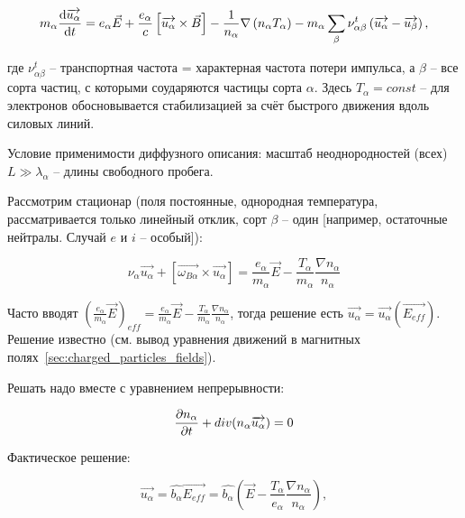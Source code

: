 \documentclass[10pt, a4paper]{article}
\begin{document}
\begin{equation*}
	m_\alpha\dv{\overrightarrow{u_\alpha}}{t}=e_\alpha\vec{E}+\frac{e_\alpha}{c}\left[\overrightarrow{u_\alpha}\times\vec{B}\right]-\frac{1}{n_\alpha}\nabla\left(n_\alpha T_\alpha\right)- m_\alpha\sum\limits_{\beta}\nu_{\alpha\beta}^t\left(\overrightarrow{u_\alpha}-\overrightarrow{u_\beta}\right),
\end{equation*}

где $\nu_{\alpha\beta}^t$ -- транспортная частота = характерная частота потери импульса, а $\beta$ -- все сорта частиц, с которыми соударяются частицы сорта $\alpha$. Здесь $T_\alpha=const$ -- для электронов обосновывается стабилизацией за счёт быстрого движения вдоль силовых линий.

Условие применимости диффузного описания: масштаб неоднородностей (всех) $L \gg \lambda_\alpha$ -- длины свободного пробега.

Рассмотрим стационар (поля постоянные, однородная температура, рассматривается только линейный отклик, сорт $\beta$ -- один [например, остаточные нейтралы. Случай $e$ и $i$ -- особый]):

\begin{equation*}
	\nu_\alpha \overrightarrow{u_\alpha} + \left[\overrightarrow{\omega_{B\alpha}}\times \overrightarrow{u_\alpha}\right] = \frac{e_\alpha}{m_\alpha}\vec{E}-\frac{T_\alpha}{m_\alpha}\frac{\nabla n_\alpha}{n_\alpha}
\end{equation*}

Часто вводят $\left(\frac{e_\alpha}{m_\alpha}\vec{E}\right)_{eff} = \frac{e_\alpha}{m_\alpha}\vec{E}-\frac{T_\alpha}{m_\alpha}\frac{\nabla n_\alpha}{n_\alpha}$, тогда решение есть $\overrightarrow{u_\alpha} = \overrightarrow{u_\alpha} (\overrightarrow{E_{eff}})$. Решение известно (см. вывод уравнения движений в магнитных полях~\eqref{sec:charged_particles_fields}).

Решать надо вместе с уравнением непрерывности:

\begin{equation*}
	\pdv{n_\alpha}{t} + div(n_\alpha\overrightarrow{u_\alpha}) = 0
\end{equation*}

Фактическое решение:

\begin{equation*}
	\overrightarrow{u_\alpha} = \widehat{b_\alpha} \overrightarrow{E_{eff}} = \widehat{b_\alpha} \left(\vec{E}-\frac{T_\alpha}{e_\alpha}\frac{\nabla n_\alpha}{n_\alpha}\right),
\end{equation*}
\end{document}
